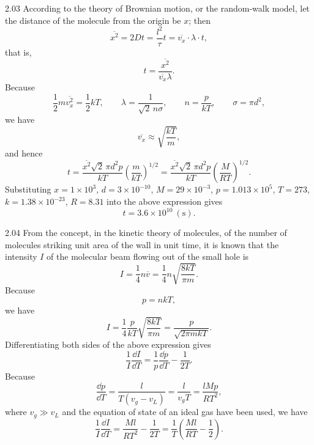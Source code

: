 \begin{solution}{2.03}
According to the theory of Brownian motion, or the random-walk model, let the distance of the molecule from the origin be $x$; then
\[
\overline{x^2}=2Dt=\frac{l^2}{\tau}t=\overline{v_x}\cdot\lambda\cdot t,
\]
that is,
\[
t=\frac{\overline{x^2}}{\overline{v_x}\lambda}.
\]
Because
\[
\frac{1}{2}m\overline{v_x^2}=\frac{1}{2}kT,
\qquad
\lambda=\frac{1}{\sqrt{2}\,n\sigma},
\qquad
n=\frac{p}{kT},
\qquad
\sigma=\pi d^2,
\]
we have
\[
\overline{v_x}\approx\sqrt{\frac{kT}{m}},
\]
and hence
\[
t=\frac{\overline{x^2}\sqrt{2}\,\pi d^2 p}{kT}\left(\frac{m}{kT}\right)^{1/2}
=\frac{\overline{x^2}\sqrt{2}\,\pi d^2 p}{kT}\left(\frac{M}{RT}\right)^{1/2}.
\]
Substituting $x=1\times10^{3}$, $d=3\times10^{-10}$, $M=29\times10^{-3}$, $p=1.013\times10^{5}$, $T=273$, $k=1.38\times10^{-23}$, $R=8.31$ into the above expression gives
\[
t=3.6\times10^{10}\ (\text{s}).
\]
\end{solution}

\begin{solution}{2.04}
From the concept, in the kinetic theory of molecules, of the number of molecules striking unit area of the wall in unit time, it is known that the intensity $I$ of the molecular beam flowing out of the small hole is
\[
I=\frac{1}{4}n\overline{v}=\frac{1}{4}n\sqrt{\frac{8kT}{\pi m}}.
\]
Because
\[
p=nkT,
\]
we have
\[
I=\frac{1}{4}\frac{p}{kT}\sqrt{\frac{8kT}{\pi m}}=\frac{p}{\sqrt{2\pi mkT}}.
\]
Differentiating both sides of the above expression gives
\[
\frac{1}{I}\frac{\dd I}{\dd T}=\frac{1}{p}\frac{\dd p}{\dd T}-\frac{1}{2T}.
\]
Because
\[
\frac{\dd p}{\dd T}=\frac{l}{T(v_g-v_L)}=\frac{l}{v_gT}=\frac{lMp}{RT^2},
\]
where $v_g\gg v_L$ and the equation of state of an ideal gas have been used, we have
\[
\frac{1}{I}\frac{\dd I}{\dd T}=\frac{Ml}{RT^2}-\frac{1}{2T}=\frac{1}{T}\left(\frac{Ml}{RT}-\frac{1}{2}\right).
\]
\end{solution}

